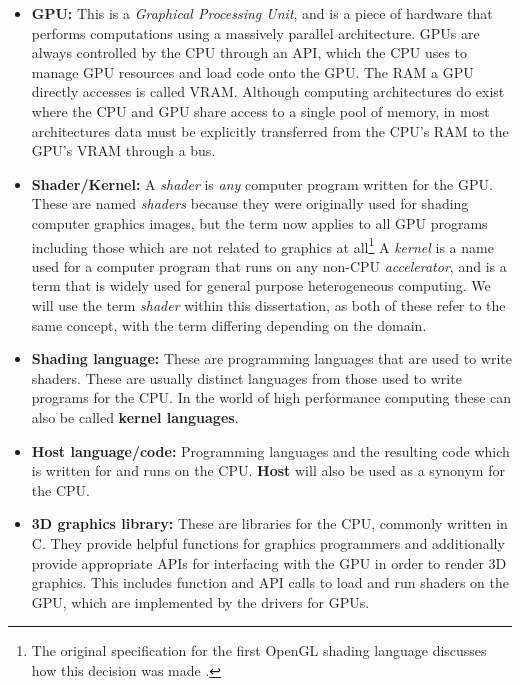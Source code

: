 \documentclass[a4paper,12pt,twoside,openright]{report}
\begin{document}
\begin{itemize}

    \item \textbf{GPU:} This is a \textit{Graphical Processing Unit}, and is a
    piece of hardware that performs computations using a massively parallel
    architecture. GPUs are always controlled by the CPU through an API, which
    the CPU uses to manage GPU resources and load code onto the GPU. The RAM a
    GPU directly accesses is called VRAM. Although computing architectures do
    exist where the CPU and GPU share access to a single pool of memory, in
    most architectures data must be explicitly transferred from the CPU's RAM
    to the GPU's VRAM through a bus.

    \item \textbf{Shader/Kernel:} A \textit{shader} is \textit{any} computer
    program written for the GPU. These are named \textit{shaders} because they
    were originally used for shading computer graphics images, but the term now
    applies to all GPU programs including those which are not related to
    graphics at all\footnote{The original specification for the first OpenGL
    shading language discusses how this decision was made \cite{GLSL_1_10}.} A
    \textit{kernel} is a name used for a computer program that runs on any
    non-CPU \textit{accelerator}, and is a term that is widely used for general
    purpose heterogeneous computing. We will use the term \textit{shader}
    within this dissertation, as both of these refer to the same concept, with
    the term differing depending on the domain.

    \item \textbf{Shading language:} These are programming languages that are
    used to write shaders. These are usually distinct languages from those used
    to write programs for the CPU. In the world of high performance computing
    these can also be called \textbf{kernel languages}.

    \item \textbf{Host language/code:} Programming languages and the resulting
    code which is written for and runs on the CPU. \textbf{Host} will also be
    used as a synonym for the CPU.

    \item \textbf{3D graphics library:} These are libraries for the CPU,
    commonly written in C. They provide helpful functions for graphics
    programmers and additionally provide appropriate APIs for interfacing with
    the GPU in order to render 3D graphics. This includes function and API
    calls to load and run shaders on the GPU, which are implemented by the
    drivers for GPUs.


\end{itemize}
\end{document}
